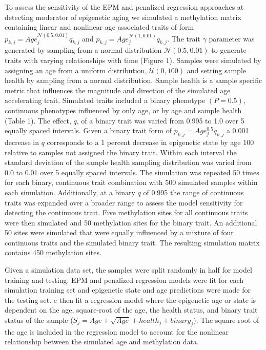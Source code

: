 \documentclass{article}
\begin{document}
{\begin{linenumbers}
To assess the sensitivity of the EPM and penalized regression approaches at detecting moderator of epigenetic aging we 
simulated a methylation matrix containing linear and nonlinear age associated traits of form 
$p_{k,j} = Age_j^{\mathcal{N}(0.5, 0.01)} q_{k,j}$ and $p_{k,j} = Age_j^{\mathcal{N}(1, 0.01)} q_{k,j}$. The 
trait $\gamma$ parameter was generated by sampling from a normal distribution $\mathcal{N}(0.5, 0.01)$ to generate 
traits with varying relationships with time (Figure 1). Samples were simulated by assigning an age from a uniform 
distribution, $\mathcal{U}(0,100)$ and setting sample health  by sampling from a normal distribution. Sample health 
is a sample specific metric that influences the magnitude and direction of the simulated age accelerating trait. 
Simulated traits included a binary phenotype  $(P=0.5)$, continuous phenotypes influenced by only age, or by age and 
sample health (Table 1). The effect, $q$, of a binary trait was varied from 0.995 to 1.0 over 5 equally spaced 
intervals. Given a binary trait form of $p_{k,j} = Age_j^{0.5} q_{k,j}$ a 0.001 decrease in $q$ corresponds to a 
1 percent decrease in epigenetic state by age 100 relative to samples not assigned the binary trait. Within each 
interval the standard deviation of the sample health sampling distribution was varied from 0.0 to 0.01 over 5 
equally spaced intervals. The simulation was repeated 50 times for each binary, continuous trait combination with 
500 simulated samples within each simulation. Additionally, at a binary $q$ of 0.995 the range of continuous traits 
was expanded over a broader range to assess the model sensitivity for detecting the continuous trait. Five methylation 
sites for all continuous traits were then simulated and 50 methylation sites for the binary trait. An additional 50 
sites were simulated that were equally influenced by a mixture of four continuous traits and the simulated  binary 
trait. The resulting simulation matrix contains 450 methylation sites. 

Given a simulation data set, the samples were split randomly in half for model training and testing. EPM and penalized 
regression models were fit for each simulation training set and epigenetic state and age predictions were made for the 
testing set. e then fit a regression model where the epigenetic age or state is dependent on the age, square-root of 
the age, the health status, and binary trait status of the sample ($S_j  = Age + \sqrt{Age} + health_j + binary_j$). 
The square-root of the age is included in the regression model to account for the nonlinear relationship between the 
simulated age and methylation data. 


\end{linenumbers}}
\end{document}
